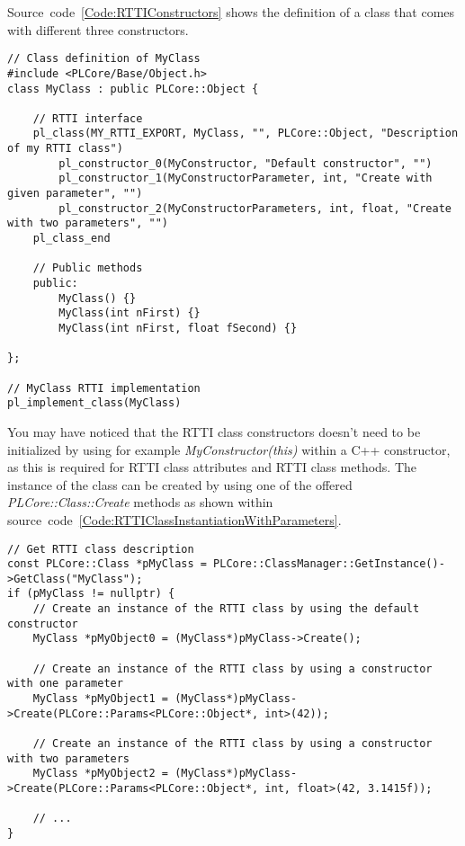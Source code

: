 Source~code~\ref{Code:RTTIConstructors} shows the definition of a class that comes with different three constructors.
\begin{lstlisting}[label=Code:RTTIConstructors,caption={RTTI class constructors with parameters}]
// Class definition of MyClass
#include <PLCore/Base/Object.h>
class MyClass : public PLCore::Object {

	// RTTI interface
	pl_class(MY_RTTI_EXPORT, MyClass, "", PLCore::Object, "Description of my RTTI class")
		pl_constructor_0(MyConstructor, "Default constructor", "")
		pl_constructor_1(MyConstructorParameter, int, "Create with given parameter", "")
		pl_constructor_2(MyConstructorParameters, int, float, "Create with two parameters", "")
	pl_class_end

	// Public methods
	public:
		MyClass() {}
		MyClass(int nFirst) {}
		MyClass(int nFirst, float fSecond) {}

};

// MyClass RTTI implementation
pl_implement_class(MyClass)
\end{lstlisting}
You may have noticed that the RTTI class constructors doesn't need to be initialized by using for example \emph{MyConstructor(this)} within a C++ constructor, as this is required for RTTI class attributes and RTTI class methods. The instance of the class can be created by using one of the offered \emph{PLCore::Class::Create} methods as shown within source~code~\ref{Code:RTTIClassInstantiationWithParameters}.
\begin{lstlisting}[label=Code:RTTIClassInstantiationWithParameters,caption={RTTI class instantiation with parameters}]
// Get RTTI class description
const PLCore::Class *pMyClass = PLCore::ClassManager::GetInstance()->GetClass("MyClass");
if (pMyClass != nullptr) {
	// Create an instance of the RTTI class by using the default constructor
	MyClass *pMyObject0 = (MyClass*)pMyClass->Create();

	// Create an instance of the RTTI class by using a constructor with one parameter
	MyClass *pMyObject1 = (MyClass*)pMyClass->Create(PLCore::Params<PLCore::Object*, int>(42));

	// Create an instance of the RTTI class by using a constructor with two parameters
	MyClass *pMyObject2 = (MyClass*)pMyClass->Create(PLCore::Params<PLCore::Object*, int, float>(42, 3.1415f));

	// ...
}
\end{lstlisting}

